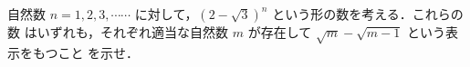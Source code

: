 \documentclass[../../main.tex]{subfiles}
\begin{document}
自然数 $n=1,2,3,\cdots\cdots$ に対して，$(2-\sqrt{3})^n$ という形の数を考える．これらの数
はいずれも，それぞれ適当な自然数 $m$ が存在して $\sqrt{m}-\sqrt{m-1}$ という表示をもつこと
を示せ．
\end{document}
